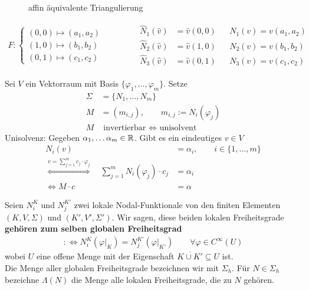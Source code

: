 \begin{beisp}\

\begin{figure}[h!]
\begin{center}

\caption{affin äquivalente Triangulierung}
\label{AbbAffinEquivTriang}
\end{center}
\end{figure}

\begin{align*}
F:\left\lbrace\begin{array}{l}
(0,0)\mapsto(a_1,a_2)\\
(1,0)\mapsto(b_1,b_2)\\
(0,1)\mapsto(c_1,c_2)
\end{array}\right.
\qquad\qquad
\begin{matrix}
\hat{N}_1(\hat{v})&=\hat{v}(0,0) &&N_1(v)=v(a_1,a_2)\\
\hat{N}_2(\hat{v})&=\hat{v}(1,0) &&N_2(v)=v(b_1,b_2)\\
\hat{N}_3(\hat{v})&=\hat{v}(0,1) &&N_3(v)=v(c_1,c_2)
\end{matrix}
\end{align*}
\end{beisp}

Sei $V$ ein Vektorraum mit Basis $\lbrace\varphi_1,\ldots,\varphi_m\rbrace$. Setze
\begin{align*}
\Sigma&=\lbrace N_1,\ldots,N_m\rbrace\\
M&=(m_{i,j}),\qquad m_{i,j}:=N_i(\varphi_j)\\
M&\text{ invertierbar }\Longleftrightarrow \text{ unisolvent}
\end{align*}
Unisolvenz: Gegeben $\alpha_1,\ldots\alpha_m\in\mathbb{R}$. Gibt es ein eindeutiges $v\in V$
\begin{align*}
N_i(v)&=\alpha_i,\qquad i\in\lbrace1,\ldots,m\rbrace\\
\stackrel{v=\sum\limits_{j=1}^m c_j\cdot\varphi_j}{\Longleftrightarrow}\quad
\sum\limits_{j=1}^m N_i(\varphi_j)\cdot c_j&=\alpha_i\\
\Longleftrightarrow
M\cdot c&=\alpha
\end{align*}

\begin{definition}\enter
Seien $N_i^K$ und $N_j^{K'}$ zwei lokale Nodal-Funktionale von den finiten Elementen $(K,V,\Sigma)$ und $(K',V',\Sigma')$. Wir sagen, diese beiden lokalen Freiheitsgrade \textbf{gehören zum selben globalen Freiheitsgrad}
\begin{align*}
:\Longleftrightarrow N_i^K(\varphi|_K)=N_j^{K'}(\varphi|_{K'})\qquad\forall\varphi\in C^\infty(U)
\end{align*}
wobei $U$ eine offene Menge mit der Eigenschaft $\overline{K\cup K'}\subseteq U$ ist.\\
Die Menge aller globalen Freiheitsgrade bezeichnen wir mit $\Sigma_h$. Für $N\in\Sigma_h$ bezeichne $\Lambda(N)$ die Menge alle lokalen Freiheitsgrade, die zu $N$ gehören.
\end{definition}


